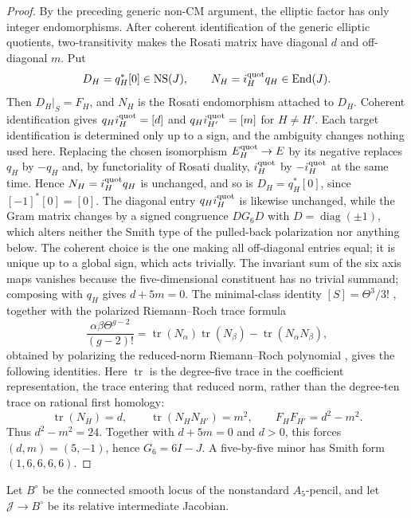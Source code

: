 \begin{proof}
By the preceding generic non-CM argument, the elliptic factor has only
integer endomorphisms.  After coherent identification of the generic elliptic quotients,
two-transitivity makes the Rosati matrix have diagonal \(d\) and
off-diagonal \(m\).  Put
\[
 D_H=q_H^*[0]\in\operatorname{NS}(J),\qquad N_H=i_H^{\rm quot}q_H\in\operatorname{End}(J).
\]
Then \(D_H|_S=F_H\), and \(N_H\) is the Rosati endomorphism attached to
\(D_H\).  Coherent identification gives \(q_Hi_H^{\rm quot}=[d]\) and
\(q_Hi_{H'}^{\rm quot}=[m]\) for \(H\ne H'\).  Each target identification is determined
only up to a sign, and the ambiguity changes nothing used here.  Replacing the
chosen isomorphism \(E_H^{\rm quot}\to E\) by its negative replaces \(q_H\) by
\(-q_H\) and, by functoriality of Rosati duality, \(i_H^{\rm quot}\) by \(-i_H^{\rm quot}\) at the
same time.  Hence \(N_H=i_H^{\rm quot}q_H\) is unchanged, and so is
\(D_H=q_H^*[0]\), since \([-1]^*[0]=[0]\).  The diagonal entry \(q_Hi_H^{\rm quot}\) is
likewise unchanged, while the Gram matrix changes by a signed congruence
\(DG_6D\) with \(D=\operatorname{diag}(\pm1)\), which alters neither the Smith
type of the pulled-back polarization nor anything below.  The coherent choice
is the one making all off-diagonal entries equal; it is unique up to a global
sign, which acts trivially.  The invariant sum of the six axis maps
vanishes because the five-dimensional constituent has no trivial summand;
composing with \(q_H\) gives \(d+5m=0\).  The minimal-class identity
\([S]=\Theta^3/3!\) \cite{CG}, together with the polarized
Riemann--Roch trace formula
\[
 \frac{\alpha\beta\Theta^{g-2}}{(g-2)!}
 =\operatorname{tr}(N_\alpha)\operatorname{tr}(N_\beta)
  -\operatorname{tr}(N_\alpha N_\beta),
\]
obtained by polarizing the reduced-norm Riemann--Roch polynomial
\cite[Theorem~4.1]{Grieve}, gives the following identities.  Here
\(\operatorname{tr}\) is the degree-five trace in the coefficient
representation, the trace entering that reduced norm, rather than the
degree-ten trace on rational first homology:
\[
 \operatorname{tr}(N_H)=d,
 \qquad \operatorname{tr}(N_HN_{H'})=m^2,
 \qquad F_HF_{H'}=d^2-m^2.
\]
Thus \(d^2-m^2=24\).  Together with \(d+5m=0\) and \(d>0\), this forces
\((d,m)=(5,-1)\), hence \(G_6=6I-J\).  A five-by-five minor has Smith form
\((1,6,6,6,6)\).
\end{proof}

Let \(B^\circ\) be the connected smooth locus of the nonstandard
\(A_5\)-pencil, and let \(\mathcal J\to B^\circ\) be its relative
intermediate Jacobian.

